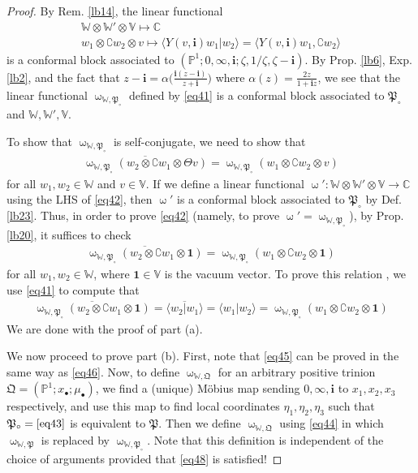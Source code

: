 \documentclass[11pt,b5paper,notitlepage]{article}
\theoremstyle{definition}
\theoremstyle{plain}
\newcommand{\fk}{\mathfrak}
\newcommand{\ovl}{\overline}
\newcommand{\id}{\mathbf{1}}
\newcommand{\bk}[1]{\langle {#1}\rangle}
\newcommand{\im}{\mathbf{i}}
\newcommand{\Co}{\complement}
\newcommand{\blt}{\bullet}
\newcommand{\Vbb}{\mathbb V}
\newcommand{\Wbb}{\mathbb W}
\newcommand{\Cbb}{\mathbb C}
\newcommand{\Pbb}{\mathbb P}
\numberwithin{equation}{section}
\begin{document}
\begin{proof}
By Rem. \ref{lb14}, the linear functional
\begin{gather*}
\Wbb\otimes\Wbb'\otimes \Vbb\mapsto \Cbb\\
w_1\otimes \Co w_2\otimes v\mapsto \bk{Y(v,\im)w_1|w_2}=\bk{Y(v,\im)w_1,\Co w_2}
\end{gather*}
is a conformal block associated to $(\Pbb^1;0,\infty,\im;\zeta,1/\zeta,\zeta-\im)$. By Prop. \ref{lb6}, Exp. \ref{lb2}, and the fact that $z-\im=\alpha\big(\frac{\im(z-\im)}{z+\im}\big)$ where $\alpha(z)=\frac {2z}{1+\im z}$, we see that the linear functional $\upomega_{\Wbb,\fk P_\circ}$ defined by \eqref{eq41} is a conformal block associated to $\fk P_\circ$ and $\Wbb,\Wbb',\Vbb$.

To show that $\upomega_{\Wbb,\fk P_\circ}$ is self-conjugate, we need to show that
\begin{align}
\ovl{\upomega_{\Wbb,\fk P_\circ}(w_2\otimes\Co w_1\otimes \Theta v)}=\upomega_{\Wbb,\fk P_\circ}(w_1\otimes \Co w_2\otimes v) \label{eq42}
\end{align}
for all $w_1,w_2\in\Wbb$ and $v\in\Vbb$. If we define a linear functional $\upomega':\Wbb\otimes\Wbb'\otimes\Vbb\rightarrow\Cbb$ using the LHS of \eqref{eq42}, then $\upomega'$ is a conformal block associated to $\fk P_\circ$ by Def. \ref{lb23}. Thus, in order to prove \eqref{eq42} (namely,  to prove $\upomega'=\upomega_{\Wbb,\fk P_\circ}$), by Prop. \ref{lb20}, it suffices to check 
\begin{align*}
\ovl{\upomega_{\Wbb,\fk P_\circ}(w_2\otimes\Co w_1\otimes \id)}=\upomega_{\Wbb,\fk P_\circ}(w_1\otimes \Co w_2\otimes \id)
\end{align*}
for all $w_1,w_2\in\Wbb$, where $\id\in\Vbb$ is the vacuum vector. To prove this relation , we use \eqref{eq41} to compute that
\begin{align*}
\ovl{\upomega_{\Wbb,\fk P_\circ}(w_2\otimes\Co w_1\otimes \id)}=\ovl{\bk{w_2|w_1}}=\bk{w_1|w_2}=\upomega_{\Wbb,\fk P_\circ}(w_1\otimes \Co w_2\otimes \id)
\end{align*}
We are done with the proof of part (a).

We now proceed to prove part (b). First, note that \eqref{eq45} can be proved in the same way as \eqref{eq46}. Now, to define $\upomega_{\Wbb,\fk Q}$ for an arbitrary positive trinion $\fk Q=(\Pbb^1;x_\blt;\mu_\blt)$, we find a (unique) M\"obius map sending $0,\infty,\im$ to $x_1,x_2,x_3$ respectively, and use this map to find local coordinates $\eta_1,\eta_2,\eta_3$ such that $\fk P_\circ=\eqref{eq43}$ is equivalent to $\fk P$. Then we define $\upomega_{\Wbb,\fk Q}$ using  \eqref{eq44} in which $\upomega_{\Wbb,\fk P}$ is replaced by $\upomega_{\Wbb,\fk P_\circ}$. Note that this definition is independent of the choice of arguments provided that \eqref{eq48} is satisfied!



\end{proof}
\end{document}
